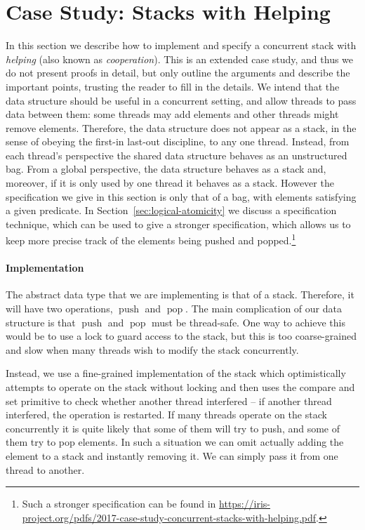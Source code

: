 \section{Case Study: Stacks with Helping}
\label{sec:case-study:stacks-with-helping}

In this section we describe how to implement and specify a
concurrent stack with \emph{helping} (also known as
\emph{cooperation}).  This is an extended case study, and thus we do
not present proofs in detail, but only outline the arguments and
describe the important points, trusting the reader to fill in the
details.  We intend that the data structure should be useful in a
concurrent setting, and allow threads to pass data between them: some
threads may add elements and other threads might remove elements.
Therefore, the data structure does not appear as a stack, in the sense
of obeying the first-in last-out discipline, to any one
thread. Instead, from each thread's perspective the shared data
structure behaves as an unstructured bag.  From a global perspective,
the data structure behaves as a stack and, moreover, if it is only
used by one thread it behaves as a stack.  However the specification
we give in this section is only that of a bag, with elements
satisfying a given predicate.  In Section~\ref{sec:logical-atomicity}
we discuss a specification technique, which can be used to 
give a stronger specification, which allows us
to keep more precise track of the elements being pushed and
popped.\footnote{Such a stronger specification can be found in
\url{https://iris-project.org/pdfs/2017-case-study-concurrent-stacks-with-helping.pdf}.}

\newcommand{\pushS}{\ensuremath{\operatorname{push}}}
\newcommand{\popS}{\ensuremath{\operatorname{pop}}}

\paragraph*{Implementation}
The abstract data type that we are implementing is that of a stack.
Therefore, it will have two operations, $\pushS$ and $\popS$.  The
main complication of our data structure is that $\pushS$ and $\popS$
must be thread-safe.  One way to achieve this would be to use a lock
to guard access to the stack, but this is too coarse-grained and slow
when many threads wish to modify the stack concurrently.

Instead, we use a fine-grained implementation of the stack which
optimistically attempts to operate on the stack without locking and
then uses the compare and set primitive to check whether another
thread interfered -- if another thread interfered, the operation is
restarted.  If many threads operate on the stack concurrently it is
quite likely that some of them will try to push, and some of them try
to pop elements.  In such a situation we can omit actually adding the
element to a stack and instantly removing it.  We can simply pass it
from one thread to another.

